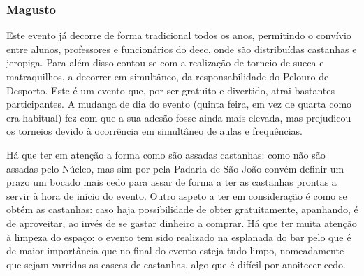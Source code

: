 
\subsubsection{Magusto}

Este evento já decorre de forma tradicional todos os anos, permitindo o convívio entre alunos, professores e funcionários do \acrshort{deec}, onde são distribuídas castanhas e jeropiga. Para além disso contou-se com a realização de torneio de sueca e matraquilhos, a decorrer em simultâneo, da responsabilidade do Pelouro de Desporto.
{ %
Este é um evento que, por ser gratuito e divertido, atrai bastantes participantes.
A mudança de dia do evento (quinta feira, em vez de quarta como era habitual) fez com que a sua adesão fosse ainda mais elevada, mas prejudicou os torneios devido à ocorrência em simultâneo de aulas e frequências.
}
{ %
}

Há que ter em atenção a forma como são assadas castanhas: como não são assadas pelo Núcleo, mas sim por pela Padaria de São João convém definir um prazo um bocado mais cedo para assar de forma a ter as castanhas prontas a servir à hora de início do evento. Outro aspeto a ter em consideração é como se obtém as castanhas: caso haja possibilidade de obter gratuitamente, apanhando, é de aproveitar, ao invés de se gastar dinheiro a comprar. Há que ter muita atenção à limpeza do espaço: o evento tem sido realizado na esplanada do bar pelo que é de maior importância que no final do evento esteja tudo limpo, nomeadamente que sejam varridas as cascas de castanhas, algo que é difícil por anoitecer cedo.
